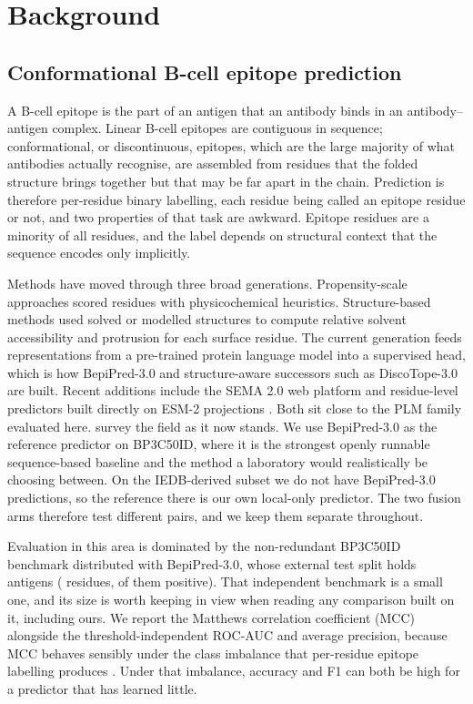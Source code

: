 \section{Background}
\label{sec:background}

\subsection{Conformational B-cell epitope prediction}

A B-cell epitope is the part of an antigen that an antibody binds in an
antibody--antigen complex. Linear B-cell epitopes are contiguous in sequence;
conformational, or discontinuous, epitopes, which are the large majority of
what antibodies actually recognise, are assembled from residues that the folded
structure brings together but that may be far apart in the chain. Prediction is
therefore per-residue binary labelling, each residue being called an epitope
residue or not, and two properties of that task are awkward. Epitope residues
are a minority of all residues, and the label depends on structural context
that the sequence encodes only implicitly.

Methods have moved through three broad generations. Propensity-scale approaches
scored residues with physicochemical heuristics. Structure-based methods used
solved or modelled structures to compute relative solvent accessibility and
protrusion for each surface residue.
The current generation feeds representations from a pre-trained protein language
model into a supervised head, which is how BepiPred-3.0 \citep{clifford2022bepipred}
and structure-aware successors such as DiscoTope-3.0 \citep{hoie2024discotope}
are built. Recent additions include the SEMA 2.0 web platform
\citep{ivanisenko2024sema} and residue-level predictors built directly on ESM-2
projections \citep{israeli2024single}. Both sit close to the PLM family
evaluated here. \citet{gabellieri2026bcell} survey the field as it now
stands. We use BepiPred-3.0 as the reference predictor on BP3C50ID, where it is the
strongest openly runnable sequence-based baseline and the method a laboratory
would realistically be choosing between. On the IEDB-derived subset we do not
have BepiPred-3.0 predictions, so the reference there is our own local-only
predictor. The two fusion arms therefore test different pairs, and we keep
them separate throughout.

Evaluation in this area is dominated by the non-redundant BP3C50ID benchmark
distributed with BepiPred-3.0, whose external test split holds
\BepipredNumAntigens{} antigens (\BepipredResidues{} residues,
\BepipredPositives{} of them positive). That independent benchmark is a small
one, and its size is worth keeping in view when reading any comparison built on
it, including ours. We report the Matthews correlation coefficient (MCC)
alongside the threshold-independent ROC-AUC and average precision, because MCC
behaves sensibly under the class imbalance that per-residue epitope labelling
produces
\citep{chicco2020mcc}. Under that imbalance, accuracy and F1 can both be high
for a predictor that has learned little.

